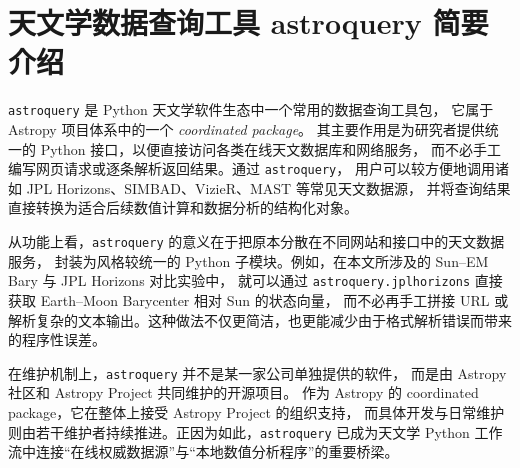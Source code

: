 \section{天文学数据查询工具 astroquery 简要介绍}

\texttt{astroquery} 是 Python 天文学软件生态中一个常用的数据查询工具包\cite{GinsburgEtAl2019,AstroqueryDocs}，
它属于 Astropy 项目体系中的一个 \emph{coordinated package}。
其主要作用是为研究者提供统一的 Python 接口，以便直接访问各类在线天文数据库和网络服务，
而不必手工编写网页请求或逐条解析返回结果。通过 \texttt{astroquery}，
用户可以较方便地调用诸如 JPL Horizons、SIMBAD、VizieR、MAST 等常见天文数据源，
并将查询结果直接转换为适合后续数值计算和数据分析的结构化对象。

从功能上看，\texttt{astroquery} 的意义在于把原本分散在不同网站和接口中的天文数据服务，
封装为风格较统一的 Python 子模块。例如，在本文所涉及的 Sun--EM Bary 与 JPL Horizons 对比实验中，
就可以通过 \texttt{astroquery.jplhorizons} 直接获取 Earth--Moon Barycenter 相对 Sun 的状态向量，
而不必再手工拼接 URL 或解析复杂的文本输出。这种做法不仅更简洁，也更能减少由于格式解析错误而带来的程序性误差。

在维护机制上，\texttt{astroquery} 并不是某一家公司单独提供的软件，
而是由 Astropy 社区和 Astropy Project 共同维护的开源项目。
作为 Astropy 的 coordinated package，它在整体上接受 Astropy Project 的组织支持，
而具体开发与日常维护则由若干维护者持续推进。正因为如此，\texttt{astroquery} 
已成为天文学 Python 工作流中连接“在线权威数据源”与“本地数值分析程序”的重要桥梁。
